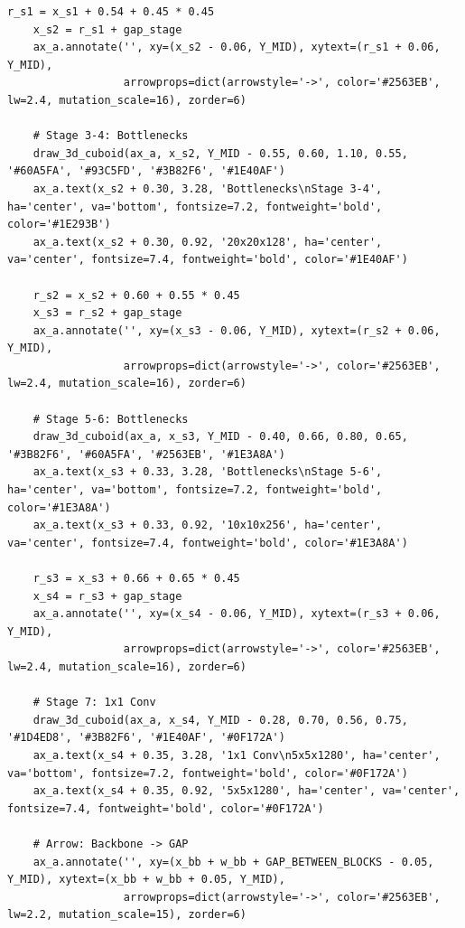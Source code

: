 \begin{lstlisting}[style=pycode]
    r_s1 = x_s1 + 0.54 + 0.45 * 0.45
    x_s2 = r_s1 + gap_stage
    ax_a.annotate('', xy=(x_s2 - 0.06, Y_MID), xytext=(r_s1 + 0.06, Y_MID),
                  arrowprops=dict(arrowstyle='->', color='#2563EB', lw=2.4, mutation_scale=16), zorder=6)

    # Stage 3-4: Bottlenecks
    draw_3d_cuboid(ax_a, x_s2, Y_MID - 0.55, 0.60, 1.10, 0.55, '#60A5FA', '#93C5FD', '#3B82F6', '#1E40AF')
    ax_a.text(x_s2 + 0.30, 3.28, 'Bottlenecks\nStage 3-4', ha='center', va='bottom', fontsize=7.2, fontweight='bold', color='#1E293B')
    ax_a.text(x_s2 + 0.30, 0.92, '20x20x128', ha='center', va='center', fontsize=7.4, fontweight='bold', color='#1E40AF')

    r_s2 = x_s2 + 0.60 + 0.55 * 0.45
    x_s3 = r_s2 + gap_stage
    ax_a.annotate('', xy=(x_s3 - 0.06, Y_MID), xytext=(r_s2 + 0.06, Y_MID),
                  arrowprops=dict(arrowstyle='->', color='#2563EB', lw=2.4, mutation_scale=16), zorder=6)

    # Stage 5-6: Bottlenecks
    draw_3d_cuboid(ax_a, x_s3, Y_MID - 0.40, 0.66, 0.80, 0.65, '#3B82F6', '#60A5FA', '#2563EB', '#1E3A8A')
    ax_a.text(x_s3 + 0.33, 3.28, 'Bottlenecks\nStage 5-6', ha='center', va='bottom', fontsize=7.2, fontweight='bold', color='#1E3A8A')
    ax_a.text(x_s3 + 0.33, 0.92, '10x10x256', ha='center', va='center', fontsize=7.4, fontweight='bold', color='#1E3A8A')

    r_s3 = x_s3 + 0.66 + 0.65 * 0.45
    x_s4 = r_s3 + gap_stage
    ax_a.annotate('', xy=(x_s4 - 0.06, Y_MID), xytext=(r_s3 + 0.06, Y_MID),
                  arrowprops=dict(arrowstyle='->', color='#2563EB', lw=2.4, mutation_scale=16), zorder=6)

    # Stage 7: 1x1 Conv
    draw_3d_cuboid(ax_a, x_s4, Y_MID - 0.28, 0.70, 0.56, 0.75, '#1D4ED8', '#3B82F6', '#1E40AF', '#0F172A')
    ax_a.text(x_s4 + 0.35, 3.28, '1x1 Conv\n5x5x1280', ha='center', va='bottom', fontsize=7.2, fontweight='bold', color='#0F172A')
    ax_a.text(x_s4 + 0.35, 0.92, '5x5x1280', ha='center', va='center', fontsize=7.4, fontweight='bold', color='#0F172A')

    # Arrow: Backbone -> GAP
    ax_a.annotate('', xy=(x_bb + w_bb + GAP_BETWEEN_BLOCKS - 0.05, Y_MID), xytext=(x_bb + w_bb + 0.05, Y_MID),
                  arrowprops=dict(arrowstyle='->', color='#2563EB', lw=2.2, mutation_scale=15), zorder=6)


\end{lstlisting}
